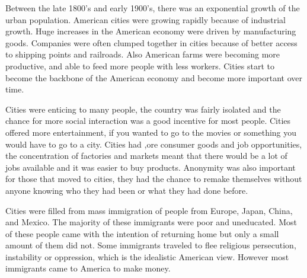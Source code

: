 Between the late 1800's and early 1900's, there was an exponential growth of the urban population.
American cities were growing rapidly because of industrial growth.
Huge increases in the American economy were driven by manufacturing goods.
Companies were often clumped together in cities because of better access to shipping points and railroads. 
Also American farms were becoming more productive, and able to feed more people with less workers.
Cities start to become the backbone of the American economy and become more important over time.

Cities were enticing to many people, the country was fairly isolated and the chance for more social interaction was a good incentive for most people.
Cities offered more entertainment, if you wanted to go to the movies or something you would have to go to a city.
Cities had ,ore consumer goods and job opportunities, the concentration of factories and markets meant that there would be a lot of jobs available and it was easier to buy products.
Anonymity was also important for those that moved to cities, they had the chance to remake themselves without anyone knowing who they had been or what they had done before.

Cities were filled from mass immigration of people from Europe, Japan, China, and Mexico.
The majority of these immigrants were poor and uneducated.
Most of these people came with the intention of returning home but only a small amount of them did not.
Some immigrants traveled to flee religious persecution, instability or oppression, which is the idealistic American view.
However most immigrants came to America to make money.